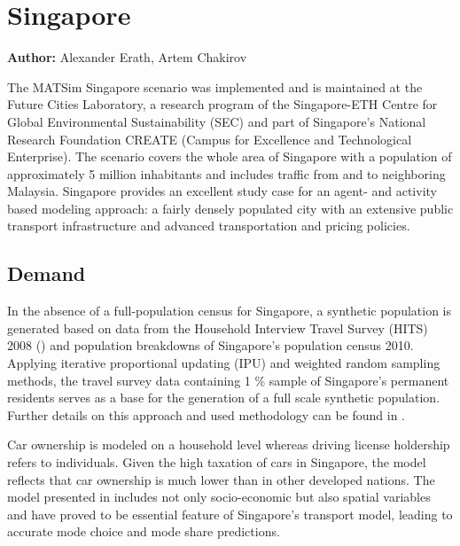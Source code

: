 \section{Singapore}
\label{ch:scenarios:singapore}
\hfill \textbf{Author:} Alexander Erath, Artem Chakirov

The MATSim Singapore scenario \citet[][]{ErathEtAl_TechRep_FCL_forth} was implemented and is maintained at the Future Cities Laboratory, a research program of the Singapore-ETH Centre for Global Environmental Sustainability (SEC) and part of Singapore's National Research Foundation CREATE (Campus for Excellence and Technological Enterprise). The scenario covers the whole area of Singapore with a population of approximately 5 million inhabitants and includes traffic from and to neighboring Malaysia. Singapore provides an excellent study case for an agent- and activity based modeling approach: a fairly densely populated city with an extensive public transport infrastructure and advanced transportation and pricing policies. 

\subsection{Demand}
In the absence of a full-population census for Singapore, a synthetic population is generated based on data from the Household Interview Travel Survey (HITS) 2008 (\citet[][]{Choi_JOUR_2010}) and population breakdowns of Singapore’s population census 2010. Applying iterative proportional updating (IPU) and weighted random sampling methods, the travel survey data containing 1 \% sample of Singapore’s permanent residents serves as a base for the generation of a full scale synthetic population. Further details on this approach and used methodology can be found in \citet[][]{FourieMueller_HKSTS_2011}.
 
Car ownership is modeled on a household level whereas driving license holdership refers to individuals. Given the high taxation of cars in Singapore, the model reflects that car ownership is much lower than in other developed nations. The model presented in \citet[][]{VanEggermondEtAl_IATBR_2012} includes not only socio-economic but also spatial variables and have proved to be essential feature of Singapore’s transport model, leading to accurate mode choice and mode share predictions. 

